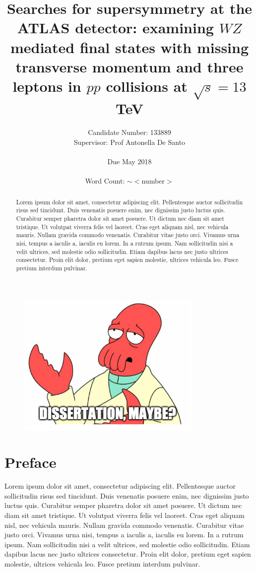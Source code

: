 \documentclass[11pt, oneside]{article}
\title{Searches for supersymmetry at the ATLAS detector: examining $WZ$ mediated final states with missing transverse momentum and three leptons in $pp$ collisions at $\sqrt{s}=13$ TeV}
\author{Candidate Number: 133889 \\ Supervisor: Prof Antonella De Santo \\ \\ Due May 2018\\ \\ Word Count: $\sim<$number$>$}
\date{}
\begin{document}
\maketitle
{}


\begin{figure}[htbp] %
   \centering
   \includegraphics[width=0.8\textwidth]{Pictures/diss.png} 
   \label{fig:example}
\end{figure}

\newpage

\begin{abstract}
Lorem ipsum dolor sit amet, consectetur adipiscing elit. Pellentesque auctor sollicitudin risus sed tincidunt. Duis venenatis posuere enim, nec dignissim justo luctus quis. Curabitur semper pharetra dolor sit amet posuere. Ut dictum nec diam sit amet tristique. Ut volutpat viverra felis vel laoreet. Cras eget aliquam nisl, nec vehicula mauris. Nullam gravida commodo venenatis. Curabitur vitae justo orci. Vivamus urna nisi, tempus a iaculis a, iaculis eu lorem. In a rutrum ipsum. Nam sollicitudin nisi a velit ultrices, sed molestie odio sollicitudin. Etiam dapibus lacus nec justo ultrices consectetur. Proin elit dolor, pretium eget sapien molestie, ultrices vehicula leo. Fusce pretium interdum pulvinar. 
\end{abstract}

\section*{Preface}
 Lorem ipsum dolor sit amet, consectetur adipiscing elit. Pellentesque auctor sollicitudin risus sed tincidunt. Duis venenatis posuere enim, nec dignissim justo luctus quis. Curabitur semper pharetra dolor sit amet posuere. Ut dictum nec diam sit amet tristique. Ut volutpat viverra felis vel laoreet. Cras eget aliquam nisl, nec vehicula mauris. Nullam gravida commodo venenatis. Curabitur vitae justo orci. Vivamus urna nisi, tempus a iaculis a, iaculis eu lorem. In a rutrum ipsum. Nam sollicitudin nisi a velit ultrices, sed molestie odio sollicitudin. Etiam dapibus lacus nec justo ultrices consectetur. Proin elit dolor, pretium eget sapien molestie, ultrices vehicula leo. Fusce pretium interdum pulvinar.
\end{document}
